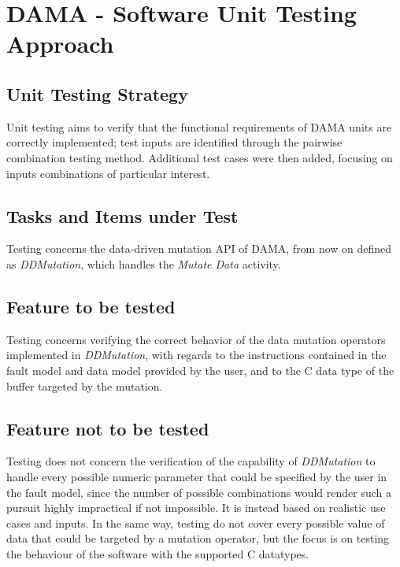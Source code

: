
\chapter{DAMA - Software Unit Testing Approach}
\label{chap:approach_DAMA}


\section{Unit Testing Strategy}


Unit testing aims to verify that the functional requirements of DAMA units are correctly implemented; test inputs are identified through the pairwise combination testing method. Additional test cases were then added, focusing on inputs combinations of particular interest.


\section{Tasks and Items under Test}

Testing concerns the data-driven mutation API of DAMA, from now on defined as \emph{DDMutation}, which handles the \emph{Mutate Data} activity.

\section{Feature to be tested}

Testing concerns verifying the correct behavior of the data mutation operators implemented in \emph{DDMutation}, with regards to the instructions contained in the fault model and data model provided by the user, and to the C data type of the buffer targeted by the mutation.

\section{Feature not to be tested}

Testing does not concern the verification of the capability of \emph{DDMutation} to handle every possible numeric parameter that could be specified by the user in the fault model, since the number of possible combinations would render such a pursuit highly impractical if not impossible.
It is instead based on realistic use cases and inputs.
In the same way, testing do not cover every possible value of data that could be targeted by a mutation operator, but the focus is on testing the behaviour of the software with the supported C datatypes.


